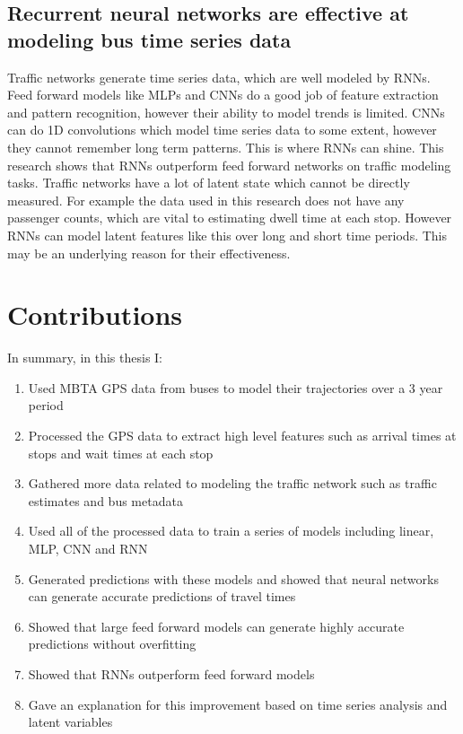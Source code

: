 \subsection{Recurrent neural networks are effective at modeling bus time series data}

Traffic networks generate time series data, which are well modeled by RNNs.
Feed forward models like MLPs and CNNs do a good job of feature extraction and pattern recognition, however their ability to model trends is limited.
CNNs can do 1D convolutions which model time series data to some extent, however they cannot remember long term patterns.
This is where RNNs can shine.
This research shows that RNNs outperform feed forward networks on traffic modeling tasks.
Traffic networks have a lot of latent state which cannot be directly measured.
For example the data used in this research does not have any passenger counts, which are vital to estimating dwell time at each stop.
However RNNs can model latent features like this over long and short time periods.
This may be an underlying reason for their effectiveness.

\section{Contributions}

In summary, in this thesis I:

\begin{enumerate}
\item Used MBTA GPS data from buses to model their trajectories over a 3 year period
\item Processed the GPS data to extract high level features such as arrival times at stops and wait times at each stop
\item Gathered more data related to modeling the traffic network such as traffic estimates and bus metadata
\item Used all of the processed data to train a series of models including linear, MLP, CNN and RNN
\item Generated predictions with these models and showed that neural networks can generate accurate predictions of travel times
\item Showed that large feed forward models can generate highly accurate predictions without overfitting
\item Showed that RNNs outperform feed forward models
\item Gave an explanation for this improvement based on time series analysis and latent variables
\end{enumerate}


